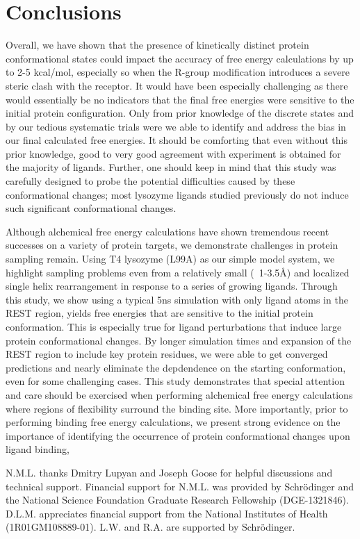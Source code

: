 \documentclass[journal=jctcce,manuscript=article]{achemso}
\begin{document}
\section{Conclusions}
Overall, we have shown that the presence of kinetically distinct protein conformational states could impact the accuracy of free energy calculations by up to 2-5 kcal/mol, especially so when the R-group modification introduces a severe steric clash with the receptor.
It would have been especially challenging as there would essentially be no indicators that the final free energies were sensitive to the initial protein configuration.
Only from prior knowledge of the discrete states and by our tedious systematic trials were we able to identify and address the bias in our final calculated free energies.  
It should be comforting that even without this prior knowledge, good to very good agreement with experiment is obtained for the majority of ligands. 
Further, one should keep in mind that this study was carefully designed to probe the potential difficulties caused by these conformational changes; most lysozyme ligands studied previously do not induce such significant conformational changes. 

Although alchemical free energy calculations have shown tremendous recent successes on a variety of protein targets\cite{FEPplus}, we demonstrate challenges in protein sampling remain. 
Using T4 lysozyme (L99A) as our simple model system, we highlight sampling problems even from a relatively small (~1-3.5\AA) and localized single helix rearrangement in response to a series of growing ligands.
Through this study, we show using a typical 5ns simulation with only ligand atoms in the REST region, yields free energies that are sensitive to the initial protein conformation.
This is especially true for ligand perturbations that induce large protein conformational changes.
By longer simulation times and expansion of the REST region to include key protein residues, we were able to get converged predictions and nearly eliminate the depdendence on the starting conformation, even for some challenging cases.
This study demonstrates that special attention and care should be exercised when performing alchemical free energy calculations where regions of flexibility surround the binding site.
More importantly, prior to performing binding free energy calculations, we present strong evidence on the importance of identifying the occurrence of protein conformational changes upon ligand binding, 

\begin{acknowledgement}
   N.M.L. thanks Dmitry Lupyan and Joseph Goose for helpful discussions and technical support. Financial support for N.M.L. was provided by Schr\"{o}dinger and the National Science Foundation Graduate Research Fellowship (DGE-1321846). D.L.M. appreciates financial support from the National Institutes of Health (1R01GM108889-01). L.W. and R.A. are supported by Schr\"{o}dinger.
\end{acknowledgement}
\end{document}
